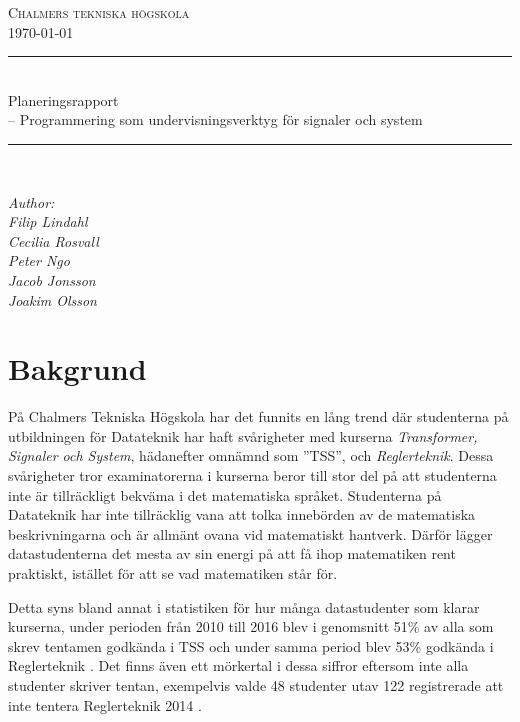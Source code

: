 \documentclass{article}
\begin{document}
\begin{titlepage} \newcommand{\HRule}{\rule{\linewidth}{0.3mm}}
\center
\textsc{\Large Chalmers tekniska högskola}\\[0.05cm] %
\normalsize \today

\HRule \\[0.08cm]
{ \large Planeringsrapport \\ \normalsize{-- Programmering som undervisningsverktyg för signaler och system}}\\[0.08cm] %
\HRule \\[0.3cm]

\vfill

\begin{flushleft} \small
    \emph{Author: \\
    \quad Filip Lindahl\\
    \quad Cecilia Rosvall\\
    \quad Peter Ngo\\
    \quad Jacob Jonsson\\
    \quad Joakim Olsson\\}
\end{flushleft}
\end{titlepage}
\newpage
\tableofcontents
\newpage

\section{Bakgrund}
På Chalmers Tekniska Högskola har det funnits en lång trend
där studenterna på utbildningen för Datateknik har haft
svårigheter med kurserna \textit{Transformer, Signaler och System},
hädanefter omnämnd som ''TSS'', och \textit{Reglerteknik}.
Dessa svårigheter tror examinatorerna i kurserna beror till
stor del på att studenterna inte är tillräckligt bekväma
i det matematiska språket.
Studenterna på Datateknik har inte tillräcklig vana att
tolka innebörden av de matematiska beskrivningarna och är
allmänt ovana vid matematiskt hantverk.
Därför lägger datastudenterna det mesta av sin energi
på att få ihop matematiken rent praktiskt,
istället för att se vad matematiken står för.

Detta syns bland annat i statistiken för hur många
datastudenter som klarar kurserna, under perioden från
2010 till 2016 blev i genomsnitt 51\% av alla som skrev
tentamen godkända i TSS och under samma period blev
53\% godkända i Reglerteknik \cite{tentastatistik}.
Det finns även ett mörkertal i dessa siffror eftersom
inte alla studenter skriver tentan, exempelvis
valde 48 studenter utav 122 registrerade att inte
tentera Reglerteknik 2014 \cite{kursinformation:ere102:14-15}.
\end{document}
